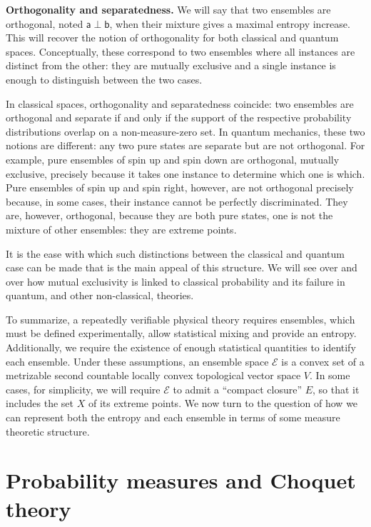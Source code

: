 \documentclass[10pt,twocolumn, nofootinbib]{revtex4-2}
\newcommand{\ens}[1][e] {\mathsf{#1}} %
\newcommand{\Ens}[1][E] {\mathcal{#1}} %
\def\ortho{\perp}
\begin{document}
\textbf{Orthogonality and separatedness.} We will say that two ensembles are orthogonal, noted $\ens[a] \ortho \ens[b]$, when their mixture gives a maximal entropy increase. This will recover the notion of orthogonality for both classical and quantum spaces. Conceptually, these correspond to two ensembles where all instances are distinct from the other: they are mutually exclusive and a single instance is enough to distinguish between the two cases. 

In classical spaces, orthogonality and separatedness coincide: two ensembles are orthogonal and separate if and only if the support of the respective probability distributions overlap on a non-measure-zero set. In quantum mechanics, these two notions are different: any two pure states are separate but are not orthogonal. For example, pure ensembles of spin up and spin down are orthogonal, mutually exclusive, precisely because it takes one instance to determine which one is which. Pure ensembles of spin up and spin right, however, are not orthogonal precisely because, in some cases, their instance cannot be perfectly discriminated. They are, however, orthogonal, because they are both pure states, one is not the mixture of other ensembles: they are extreme points.

It is the ease with which such distinctions between the classical and quantum case can be made that is the main appeal of this structure. We will see over and over how mutual exclusivity is linked to classical probability and its failure in quantum, and other non-classical, theories.

To summarize, a repeatedly verifiable physical theory requires ensembles, which must be defined experimentally, allow statistical mixing and provide an entropy. Additionally, we require the existence of enough statistical quantities to identify each ensemble. Under these assumptions, an ensemble space $\Ens$ is a convex set of a metrizable second countable locally convex topological vector space $V$. In some cases, for simplicity, we will require $\Ens$ to admit a ``compact closure'' $E$, so that it includes the set $X$ of its extreme points. We now turn to the question of how we can represent both the entropy and each ensemble in terms of some measure theoretic structure.

\section{Probability measures and Choquet theory}
\end{document}
